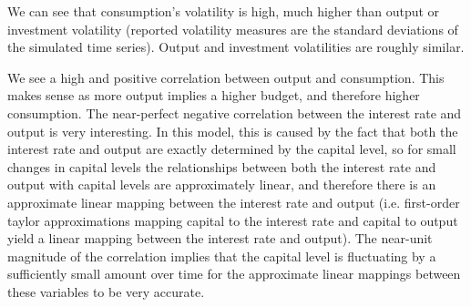 \documentclass[11pt]{article} %
\begin{document}
\begin{center}

\end{center}

We can see that consumption's volatility is high, much higher than output or investment volatility (reported volatility measures are the standard deviations of the simulated time series). Output and investment volatilities are roughly similar.

We see a high and positive correlation between output and consumption. This makes sense as more output implies a higher budget, and therefore higher consumption. The near-perfect negative correlation between the interest rate and output is very interesting. In this model, this is caused by the fact that both the interest rate and output are exactly determined by the capital level, so for small changes in capital levels the relationships between both the interest rate and output with capital levels are approximately linear, and therefore there is an approximate linear mapping between the interest rate and output (i.e. first-order taylor approximations mapping capital to the interest rate and capital to output yield a linear mapping between the interest rate and output). The near-unit magnitude of the correlation implies that the capital level is fluctuating by a sufficiently small amount over time for the approximate linear mappings between these variables to be very accurate.
\end{document}
